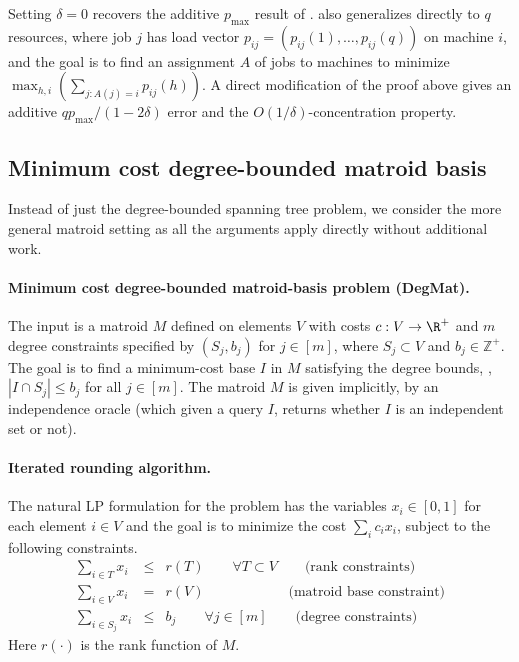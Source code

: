 \documentclass{toc}
\begin{document}
\begin{remark} Setting $\delta = 0$ recovers the additive $p_{\max}$ result of \cite{LST}. 
 also generalizes directly to $q$ resources, where 
job $j$ has load vector $p_{ij} = (p_{ij}(1),\ldots,p_{ij}(q))$ on machine $i$, and the goal is to find an
assignment $A$  of jobs to machines to minimize $\max_{h,i} (\sum_{j: A(j)=i} p_{ij}(h))$.
A direct modification of the proof above gives an additive $q p_{\max}/(1-2\delta) $ error and the $O(1/\delta)$-concentration property.
\end{remark}
%
%
%

\subsection{Minimum cost degree-bounded matroid basis} %
%
\label{s:spanning-tree}
Instead of just the degree-bounded spanning tree problem, we consider the more general matroid setting as all the arguments apply directly without additional work.
\paragraph{Minimum cost degree-bounded matroid-basis problem (DegMat).}
The input is a matroid $M$ defined
on elements $V$ with costs $c:V \rightarrow \R^+$ and $m$ degree constraints specified by $(S_j , b_j)$ for $j\in [m]$,
where
$S_j \subset V$ and $b_j \in \mathbb{Z}^+$. The goal is to find a minimum-cost base $I$ in $M$ satisfying the degree bounds, \ie, $|I \cap S_j | \leq b_j$ for all $j \in [m]$. The matroid $M$
is given implicitly, by an independence oracle (which given a query $I$, returns whether $I$ is an independent set or not).

\paragraph{Iterated rounding algorithm.}
The natural LP formulation for the problem has the variables $x_i \in [0,1]$ for each element $i\in V$ and the goal is to minimize the cost $ \sum_i c_i x_i$, subject to the following constraints.
\begin{eqnarray*}
\sum_{i \in T} x_i & \leq & r(T)  \qquad \forall T \subset V   \qquad  \text{(rank constraints)}\\
\sum_{i \in V} x_i &= & r(V) \qquad \qquad \qquad  \text{(matroid base constraint)} \\
\sum_{i \in S_j} x_i & \leq  & b_j  \qquad \forall j \in [m]  \qquad \text{(degree constraints)}
 \end{eqnarray*}
Here $r(\cdot)$ is the rank function of $M$.
\end{document}
